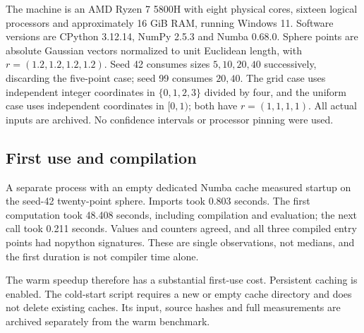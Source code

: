 \documentclass[12pt,a4paper]{article}
\begin{document}
The machine is an AMD Ryzen 7 5800H with eight physical cores, sixteen logical
processors and approximately 16 GiB RAM, running Windows 11. Software versions
are CPython 3.12.14, NumPy 2.5.3 and Numba 0.68.0. Sphere points are absolute
Gaussian vectors normalized to unit Euclidean length, with $r=(1.2,1.2,1.2,1.2)$.
Seed 42 consumes sizes $5,10,20,40$ successively, discarding the five-point
case; seed 99 consumes $20,40$. The grid case uses independent integer
coordinates in $\{0,1,2,3\}$ divided by four, and the uniform case uses
independent coordinates in $[0,1)$; both have $r=(1,1,1,1)$.
All actual inputs are archived. No confidence intervals or processor pinning
were used.

\subsection*{First use and compilation}
A separate process with an empty dedicated Numba cache measured startup on
the seed-42 twenty-point sphere. Imports took 0.803 seconds. The first
computation took 48.408 seconds, including compilation and evaluation; the
next call took 0.211 seconds. Values and counters agreed, and all three
compiled entry points had nopython signatures. These are single observations,
not medians, and the first duration is not compiler time alone.

The warm speedup therefore has a substantial first-use cost. Persistent
caching is enabled. The cold-start script requires a new or empty cache
directory and does not delete existing caches. Its input, source hashes and
full measurements are archived separately from the warm benchmark.
\end{document}
